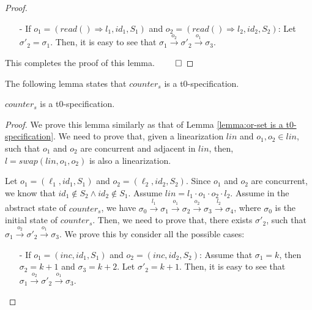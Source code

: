 {\begin {proof}
\begin{itemize}
\item[-] If $o_1 = (\mathit{read}() \Rightarrow l_1,\mathit{id}_1,S_1)$ and $o_2 = (\mathit{read}() \Rightarrow l_2,\mathit{id}_2,S_2)$: Let $\sigma'_2 = \sigma_1$. Then, it is easy to see that $\sigma_1 {\xrightarrow{o_2}} \sigma'_2 {\xrightarrow{o_1}} \sigma_3$.
\end{itemize}

This completes the proof of this lemma. $\qed$
\end {proof}




The following lemma states that $\mathit{counter}_s$ is a t0-specification.

\begin{lemma}
\label{lemma:counter is a t0-specification}
$\mathit{counter}_s$ is a t0-specification.
\end{lemma}


\begin {proof}

We prove this lemma similarly as that of Lemma \ref{lemma:or-set is a t0-specification}. We need to prove that, given a linearization $\mathit{lin}$ and $o_1,o_2 \in \mathit{lin}$, such that $o_1$ and $o_2$ are concurrent and adjacent in $\mathit{lin}$, then, $l = \mathit{swap}(\mathit{lin},o_1,o_2)$ is also a linearization.

Let $o_1 = (\ell_1,\mathit{id}_1,S_1)$ and $o_2 = (\ell_2,\mathit{id}_2,S_2)$. Since $o_1$ and $o_2$ are concurrent, we know that $\mathit{id}_1 \notin S_2 \wedge \mathit{id}_2 \notin S_1$. Assume $\mathit{lin} = l_1 \cdot o_1 \cdot o_2 \cdot l_2$. Assume in the abstract state of $\mathit{counter}_s$, we have $\sigma_0 {\xrightarrow{l_1}} \sigma_1 {\xrightarrow{o_1}} \sigma_2 {\xrightarrow{o_2}} \sigma_3 {\xrightarrow{l_2}} \sigma_4$, where $\sigma_0$ is the initial state of $\mathit{counter}_s$. Then, we need to prove that, there exists $\sigma'_2$, such that $\sigma_1 {\xrightarrow{o_2}} \sigma'_2 {\xrightarrow{o_1}} \sigma_3$. We prove this by consider all the possible cases:

\begin{itemize}
\setlength{\itemsep}{0.5pt}
\item[-] If $o_1 = (\mathit{inc},\mathit{id}_1,S_1)$ and $o_2 = (\mathit{inc},\mathit{id}_2,S_2)$: Assume that $\sigma_1 = k$, then $\sigma_2 = \mathit{k+1}$ and $\sigma_3 = \mathit{k+2}$. Let $\sigma'_2 = \mathit{k+1}$. Then, it is easy to see that $\sigma_1 {\xrightarrow{o_2}} \sigma'_2 {\xrightarrow{o_1}} \sigma_3$.


\end{itemize}
\end{proof}}
